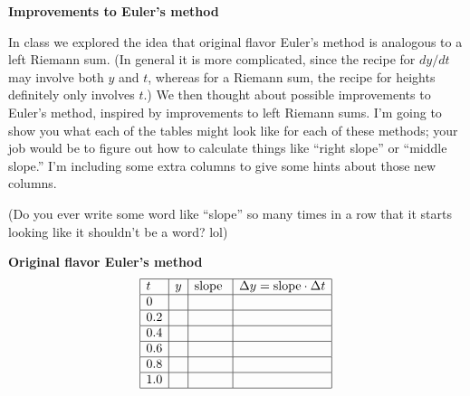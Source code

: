 \documentclass[12pt]{article}
\renewcommand{\section}[1]{\begin{center} \textbf{#1} \\\end{center}}
\renewcommand{\subsection}[1]{\textbf{#1} \\}
\begin{document}
%


\allowdisplaybreaks
\section{Improvements to Euler's method}

In class we explored the idea that original flavor Euler's method is analogous to a left Riemann sum. (In general it is more complicated, since the recipe for $dy/dt$ may involve both $y$ and $t$, whereas for a Riemann sum, the recipe for heights definitely only involves $t$.) We then thought about possible improvements to Euler's method, inspired by improvements to left Riemann sums. I'm going to show you what each of the tables might look like for each of these methods; your job would be to figure out how to calculate things like ``right slope'' or ``middle slope.'' I'm including some extra columns to give some hints about those new columns.

(Do you ever write some word like ``slope'' so many times in a row that it starts looking like it shouldn't be a word? lol)

\subsection{Original flavor Euler's method}
\[
    \begin{array}{|l|l|l|l|} 
    \hline
    t & 
    y & 
    \textrm{slope } & 
    \Delta y = \textrm{slope}\cdot\Delta t \\\hline
    0                   & & & \\\hline
    0.2                 & & & \\\hline
    0.4                 & & & \\\hline
    0.6                 & & & \\\hline
    0.8                 & & & \\\hline
    1.0                 & & & \\\hline
    \end{array}
\]
\end{document}
